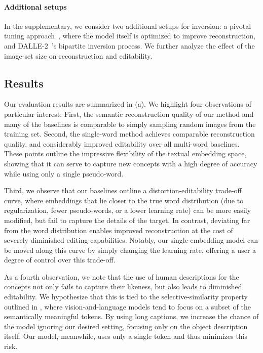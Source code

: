 \paragraph{Additional setups}
In the supplementary, we consider two additional setups for inversion: a pivotal tuning approach~\citep{roich2021pivotal,bau2020semantic}, where the model itself is optimized to improve reconstruction, and DALLE-2~\citep{ramesh2022hierarchical}'s bipartite inversion process. We further analyze the effect of the image-set size on reconstruction and editability.

\subsection{Results}



Our evaluation results are summarized in (a). 
We highlight four observations of particular interest:
First, the semantic reconstruction quality of our method and many of the baselines is comparable to simply sampling random images from the training set. 
Second, the single-word method achieves comparable reconstruction quality, and considerably improved editability over all multi-word baselines. These points outline the impressive flexibility of the textual embedding space, showing that it can serve to capture new concepts with a high degree of accuracy while using only a single pseudo-word.

Third, we observe that our baselines outline a distortion-editability trade-off curve, where embeddings that lie closer to the true word distribution (\eg due to regularization, fewer pseudo-words, or a lower learning rate) can be more easily modified, but fail to capture the details of the target. In contrast, deviating far from the word distribution enables improved reconstruction at the cost of severely diminished editing capabilities. Notably, our single-embedding model can be moved along this curve by simply changing the learning rate, offering a user a degree of control over this trade-off. 

As a fourth observation, we note that the use of human descriptions for the concepts not only fails to capture their likeness, but also leads to diminished editability. We hypothesize that this is tied to the selective-similarity property outlined in \citet{paiss2022no}, where vision-and-language models tend to focus on a subset of the semantically meaningful tokens. By using long captions, we increase the chance of the model ignoring our desired setting, focusing only on the object description itself. Our model, meanwhile, uses only a single token and thus minimizes this risk.


